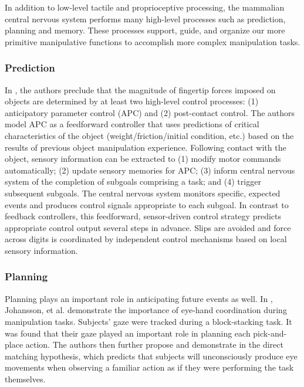 In addition to low-level tactile and proprioceptive processing, the mammalian central nervous system performs many high-level processes such as prediction, planning and memory.
These processes support, guide, and organize our more primitive manipulative functions to accomplish more complex manipulation tasks.

\subsubsection*{Prediction}

In \cite{johansson1994grasp}, the authors preclude that the magnitude of fingertip forces imposed on objects are determined by at least two high-level control processes: (1) anticipatory parameter control (APC) and (2) post-contact control.
The authors model APC as a feedforward controller that uses predictions of critical characteristics of the object (weight/friction/initial condition, etc.) based on the results of previous object manipulation experience.
Following contact with the object, sensory information can be extracted to (1) modify motor commands automatically; (2) update sensory memories for APC; (3) inform central nervous system of the completion of subgoals comprising a task; and (4) trigger subsequent subgoals.
The central nervous system monitors specific, expected events and produces control signals appropriate to each subgoal.
In contrast to feedback controllers, this feedforward, sensor-driven control strategy predicts appropriate control output several steps in advance.
Slips are avoided and force across digits is coordinated by independent control mechanisms based on local sensory information.

\subsubsection*{Planning}

Planning plays an important role in anticipating future events as well.
In \cite{johansson2001eye}, Johansson, et al. demonstrate the importance of eye-hand coordination during manipulation tasks.
Subjects' gaze were tracked during a block-stacking task.
It was found that their gaze played an important role in planning each pick-and-place action.
The authors then further propose and demonstrate in \cite{flanagan2003action} the direct matching hypothesis, which predicts that subjects will unconsciously produce eye movements when observing a familiar action as if they were performing the task themselves.

